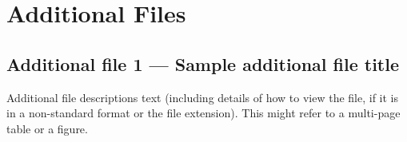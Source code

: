 \section*{Additional Files}
\subsection*{Additional file 1 --- Sample additional file title}
Additional file descriptions text (including details of how to
view the file, if it is in a non-standard format or the file extension).  This might
refer to a multi-page table or a figure.
